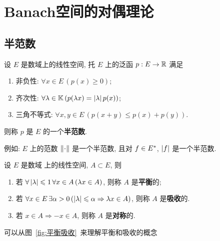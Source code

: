 
\chapter{Banach空间的对偶理论}
\section{半范数}
	\begin{Definition}[半范数]\label{def:半范数}
		设 $ E $ 是数域\K 上的线性空间, 托 $ E $ 上的泛函 $ p : E\to \mathbb{R} $ 满足
		\begin{enumerate}[(1)]
			\item 非负性: $ \forall x\in E\,(p(x)\geqslant0) $;
			\item 齐次性: $ \forall \lambda\in\mathbb{K}\,(p(\lambda x)=\left| \lambda \right| p(x)) $;
			\item 三角不等式: $ \forall x, y\in E\,(p(x+y)\leqslant p(x)+p(y)) $.
		\end{enumerate}
		则称 $ p $ 是 $ E $ 的一个\textbf{半范数}. 
	\end{Definition}
	例如: $ E $ 上的范数 $ \left\| \cdot \right\| $ 是一个半范数, 且对 $ f\in E^{*} $,  $ \left| f \right|  $ 是一个半范数.
	\begin{Definition}[平衡, 吸收]\label{def:平衡吸收}
		设 $ E $ 是数域 \K 上的线性空间,  $ A\subset E $, 则
		\begin{enumerate}[(1)]
			\item 若 $ \forall\left| \lambda \right| \leqslant1\,\forall x\in A\,(\lambda x\in A) $, 则称 $ A $ 是\textbf{平衡}的;
			\item 若 $ \forall x\in E\,\exists \alpha>0\,(\left| \lambda \right| \leqslant\alpha\Rightarrow\lambda x \in A) $, 则称 $ A $ 是\textbf{吸收}的. 
			\item 若 $ x\in A\Rightarrow -x\in A $, 则称 $ A $ 是\textbf{对称}的.  
		\end{enumerate}
	\end{Definition}
	可以从图~\ref{fig:平衡吸收}~来理解平衡和吸收的概念
